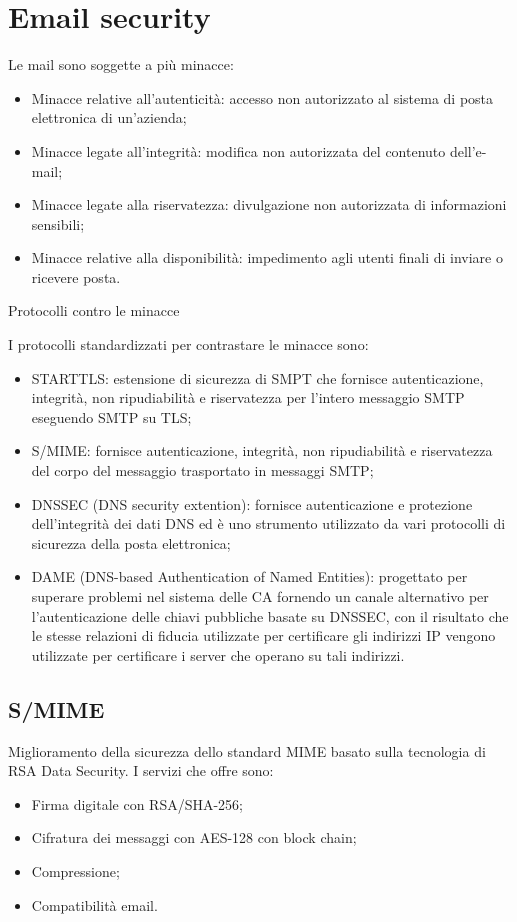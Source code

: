 \section{Email security}

Le mail sono soggette a più minacce:
\begin{itemize}
    \item Minacce relative all'autenticità: accesso non autorizzato al sistema di posta elettronica di un'azienda;
	\item Minacce legate all'integrità: modifica non autorizzata del contenuto dell'e-mail;
	\item Minacce legate alla riservatezza: divulgazione non autorizzata di informazioni sensibili;
	\item Minacce relative alla disponibilità: impedimento agli utenti finali di inviare o ricevere posta.
\end{itemize}

Protocolli contro le minacce

I protocolli standardizzati per contrastare le minacce sono:
\begin{itemize}
    \item STARTTLS: estensione di sicurezza di SMPT che fornisce autenticazione, integrità, non ripudiabilità e riservatezza per l'intero messaggio SMTP eseguendo SMTP su TLS;
	\item S/MIME: fornisce autenticazione, integrità, non ripudiabilità e riservatezza del corpo del messaggio trasportato in messaggi SMTP;
	\item DNSSEC (DNS security extention): fornisce autenticazione e protezione dell'integrità dei dati DNS ed è uno strumento utilizzato da vari protocolli di sicurezza della posta elettronica;
	\item DAME (DNS-based Authentication of Named Entities): progettato per superare problemi nel sistema delle CA fornendo un canale alternativo per l'autenticazione delle chiavi pubbliche basate su DNSSEC, con il risultato che le stesse relazioni di fiducia utilizzate per certificare gli indirizzi IP vengono utilizzate per certificare i server che operano su tali indirizzi.
\end{itemize}

\subsection{S/MIME}

Miglioramento della sicurezza dello standard MIME basato sulla tecnologia di RSA Data Security.
I servizi che offre sono:
\begin{itemize}
    \item Firma digitale con RSA/SHA-256;
	\item Cifratura dei messaggi con AES-128 con block chain;
	\item Compressione;
	\item Compatibilità email.
\end{itemize}

